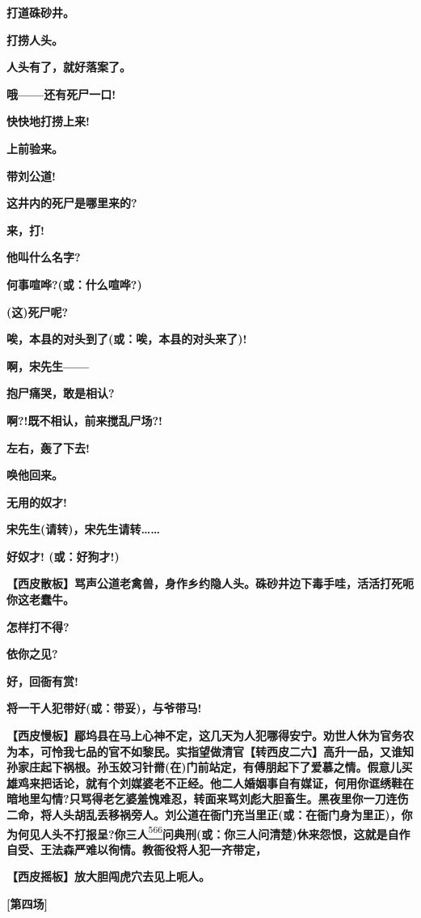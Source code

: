 \textbf{打道硃砂井。}

\textbf{打捞人头。}

\textbf{人头有了，就好落案了。}

\textbf{哦------还有死尸一口!}

\textbf{快快地打捞上来!}

\textbf{上前验来。}

\textbf{带刘公道!}

\textbf{这井内的死尸是哪里来的?}

\textbf{来，打!}

\textbf{他叫什么名字?}

\textbf{何事喧哗?(或：什么喧哗?)}

\textbf{(这)死尸呢?}

\textbf{唉，本县的对头到了(或：唉，本县的对头来了)!}

\textbf{啊，宋先生------}

\textbf{抱尸痛哭，敢是相认?}

\textbf{啊?!既不相认，前来搅乱尸场?!}

\textbf{左右，轰了下去!}

\textbf{唤他回来。}

\textbf{无用的奴才!}

\textbf{宋先生(请转)，宋先生请转\ldots{}\ldots{}}

\textbf{好奴才! (或：好狗才!)}

\textbf{【西皮散板】骂声公道老禽兽，身作乡约隐人头。硃砂井边下毒手哇，活活打死呃你这老蠢牛。}

\textbf{怎样打不得?}

\textbf{依你之见?}

\textbf{好，回衙有赏!}

\textbf{将一干人犯带好(或：带妥)，与爷带马!}

\textbf{【西皮慢板】郿坞县在马上心神不定，这几天为人犯哪得安宁。劝世人休为官务农为本，可怜我七品的官不如黎民。实指望做清官【转西皮二六】高升一品，又谁知孙家庄起下祸根。孙玉姣习针黹(在)门前站定，有傅朋起下了爱慕之情。假意儿买雄鸡来把话论，就有个刘媒婆老不正经。他二人婚姻事自有媒证，何用你诓绣鞋在暗地里勾情?只骂得老乞婆羞愧难忍，转面来骂刘彪大胆畜生。黑夜里你一刀连伤二命，将人头胡乱丢移祸旁人。刘公道在衙门充当里正(或：在衙门身为里正)，你为何见人头不打报呈?你三人}\protect\hyperlink{fn566}{\textsuperscript{566}}\textbf{问典刑(或：你三人问清楚)休来怨恨，这就是自作自受、王法森严难以徇情。教衙役将人犯一齐带定，}

\textbf{【西皮摇板】放大胆闯虎穴去见上呃人。}

\textbf{{[}第四场{]}}

